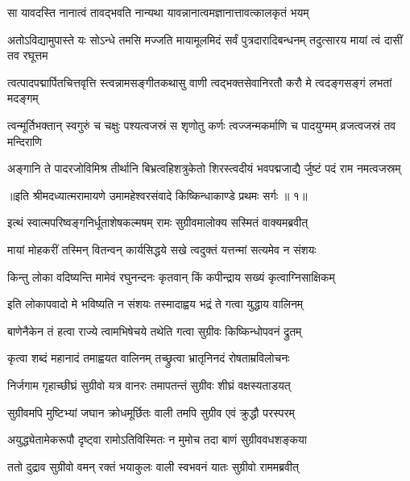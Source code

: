 \twolineshloka
{सा यावदस्ति नानात्वं तावद्भवति नान्यथा}
{यावन्नानात्वमज्ञानात्तावत्कालकृतं भयम्} %

\threelineshloka
{अतोऽविद्यामुपास्ते यः सोऽन्धे तमसि मज्जति}
{मायामूलमिदं सर्वं पुत्रदारादिबन्धनम्}
{तदुत्सारय मायां त्वं दासीं तव रघूत्तम} %

\fourlineindentedshloka
{त्वत्पादपद्मार्पितचित्तवृत्ति\-}
{स्त्वन्नामसङ्गीतकथासु वाणी}
{त्वद्भक्तसेवानिरतौ करौ मे}
{त्वदङ्गसङ्गं लभतां मदङ्गम्} %

\fourlineindentedshloka
{त्वन्मूर्तिभक्तान् स्वगुरुं च चक्षुः}
{पश्यत्वजस्रं स शृणोतु कर्णः}
{त्वज्जन्मकर्माणि च पादयुग्मम्}
{व्रजत्वजस्रं तव मन्दिराणि} %

\fourlineindentedshloka
{अङ्गानि ते पादरजोविमिश्र\-}
{तीर्थानि बिभ्रत्वहिशत्रुकेतो}
{शिरस्त्वदीयं भवपद्मजाद्यै\-}
{र्जुष्टं पदं राम नमत्वजस्रम्} %

{॥इति श्रीमदध्यात्मरामायणे उमामहेश्वरसंवादे किष्किन्धाकाण्डे
प्रथमः सर्गः ॥ १॥
}




\twolineshloka
{इत्थं स्वात्मपरिष्वङ्गनिर्धूताशेषकल्मषम्}
{रामः सुग्रीवमालोक्य सस्मितं वाक्यमब्रवीत्} %

\twolineshloka
{मायां मोहकरीं तस्मिन् वितन्वन् कार्यसिद्धये}
{सखे त्वदुक्तं यत्तन्मां सत्यमेव न संशयः} %

\twolineshloka
{किन्तु लोका वदिष्यन्ति मामेवं रघुनन्दनः}
{कृतवान् किं कपीन्द्राय सख्यं कृत्वाग्निसाक्षिकम्} %

\twolineshloka
{इति लोकापवादो मे भविष्यति न संशयः}
{तस्मादाह्वय भद्रं ते गत्वा युद्धाय वालिनम्} %

\twolineshloka
{बाणेनैकेन तं हत्वा राज्ये त्वामभिषेचये}
{तथेति गत्वा सुग्रीवः किष्किन्धोपवनं द्रुतम्} %

\twolineshloka
{कृत्वा शब्दं महानादं तमाह्वयत वालिनम्}
{तच्छ्रुत्वा भ्रातृनिनदं रोषताम्रविलोचनः} %

\twolineshloka
{निर्जगाम गृहाच्छीघ्रं सुग्रीवो यत्र वानरः}
{तमापतन्तं सुग्रीवः शीघ्रं वक्षस्यताडयत्} %

\twolineshloka
{सुग्रीवमपि मुष्टिभ्यां जघान क्रोधमूर्छितः}
{वाली तमपि सुग्रीव एवं क्रुद्धौ परस्परम्} %

\twolineshloka
{अयुद्ध्येतामेकरूपौ दृष्ट्वा रामोऽतिविस्मितः}
{न मुमोच तदा बाणं सुग्रीववधशङ्कया} %

\twolineshloka
{ततो दुद्राव सुग्रीवो वमन् रक्तं भयाकुलः}
{वाली स्वभवनं यातः सुग्रीवो राममब्रवीत्} %


